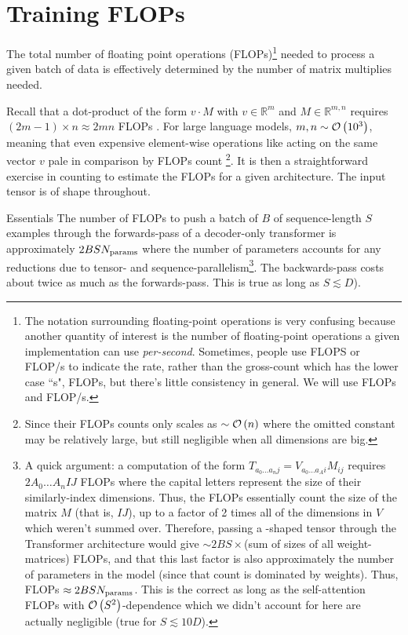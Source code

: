 \documentclass[11pt]{article}
\begin{document}
\section{Training FLOPs \label{sec_flops_training} }

The total number of floating point operations (FLOPs)\footnote{The notation surrounding
	floating-point operations is very confusing because another quantity of interest is the number
	of floating-point operations a given implementation can use \textit{per-second}. Sometimes,
	people use FLOPS or FLOP/s to indicate the rate, rather than the gross-count which has the lower
	case ``s", FLOPs, but there's little consistency in general. We will use FLOPs and FLOP/s.}  needed to process a given batch of
data is effectively determined by the number of matrix multiplies needed.

Recall that a dot-product of the form $ v \cdot M $  with $ v \in \mathbb{R}^{ m } $ and $ M \in
	\mathbb{R} ^{ m, n }$ requires $ \left (2 m-1 \right )\times n \approx 2mn$ FLOPs .
For large language models, $ m,n \sim \mathcal{O} \left( 10 ^{ 3 } \right)  $, meaning that even expensive
element-wise operations like  acting on the same vector $ v $ pale in comparison by
FLOPs count \footnote{Since their FLOPs counts only scales as $ \sim \mathcal{O} \left( n\right )  $ where
	the omitted constant may be relatively large, but still negligible when all dimensions are big.}. It
is then a straightforward exercise in counting to estimate the FLOPs for a given architecture. The
input tensor is of shape  throughout.

\begin{nicebox}{Essentials}
	The number of FLOPs to push a batch of $ B $ of sequence-length $ S $ examples through the forwards-pass
	of a decoder-only transformer is approximately $ 2BS N _{ {\rm params}  } $ where the number of
	parameters accounts for any reductions due to tensor- and sequence-parallelism\footnote{A quick argument: a
	computation of the form $T _{ a _{ 0 }\ldots  a _{ n }j } =V _{ a _{ 0 }\ldots a _{ A
			}i }M _{ ij } $ requires $ 2A _{ 0 }\ldots A _{ n }IJ $ FLOPs where the capital letters
	represent the size of their similarly-index dimensions. Thus, the FLOPs
	essentially count the size of the matrix $ M $ (that is, $ IJ $), up to a factor of 2 times all of the
	dimensions in $ V $ which weren't summed over. Therefore, passing a
	-shaped tensor through the Transformer architecture would give $ \sim 2BS\times
	$(sum of sizes of all weight-matrices) FLOPs, and that this last factor is also approximately the number of
	parameters in the model (since that count is dominated by weights). Thus, FLOPs $ \approx 2BSN _{
				{\rm params}  } $. This is the correct as long as the self-attention FLOPs with $ \mathcal{O} \left( S ^{ 2 } \right)$-dependence which we
	didn't account for here are actually negligible (true for $ S \lesssim 10  D $).}. The backwards-pass
	costs about twice as much as the forwards-pass. This is true as long as $ S \lesssim D $).
\end{nicebox}
\end{document}
